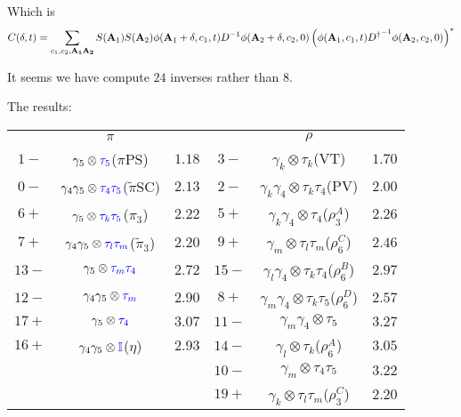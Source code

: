 Which is
\begin{equation}
\begin{split}
&C(\delta,t)=\sum _{c_1,c_2,\bf A _1 A_2}S({\bf A}_1)S({\bf A}_2) \phi ({\bf A}_1+\delta,c_1,t) D^{-1} \phi({\bf A}_2+\delta,c_2,0) \left(\phi ({\bf A}_1,c_1,t) {D^{\dagger}}^{-1} \phi({\bf A}_2,c_2,0)\right)^*\\
\end{split}
\end{equation}

It seems we have compute $24$ inverses rather than $8$.

The results:

\begin{table}
\begin{center}
\begin{tabular}{ccc|ccc}
\hline
 & $\pi$ & & & $\rho$ & \\
$1-$ & $\gamma_5 \otimes \textcolor[rgb]{0,0,1}{\tau _5}$($\pi$PS) & $1.18$ & $3-$ & $\gamma_k\otimes \tau_k$(VT) & $1.70$ \\
$0-$ & $\gamma _4\gamma _5\otimes \textcolor[rgb]{0,0,1}{\tau _4\tau _5}$($\tilde{\pi}$SC) & $2.13$ & $2-$ & $\gamma_k\gamma_4\otimes \tau_k\tau_4$(PV) & $2.00$ \\
$6+$ & $\gamma_5 \otimes \textcolor[rgb]{0,0,1}{\tau _k\tau _5}$($\pi_3$) & $2.22$ & $5+$ & $\gamma_k\gamma _4\otimes \tau_4$($\rho_3^A$) & $2.26$ \\
$7+$ & $\gamma _4\gamma_5 \otimes \textcolor[rgb]{0,0,1}{\tau _l\tau _m}$($\tilde{\pi}_3$) & $2.20$ & $9+$ & $\gamma_m\otimes \tau _l\tau_m$($\rho_6^C$) & $2.46$ \\
$13-$ & $\gamma_5 \otimes \textcolor[rgb]{0,0,1}{\tau _m\tau _4}$ & $2.72$ & $15-$ & $\gamma_l\gamma _4\otimes \tau_k\tau _4$($\rho_6^B$) & $2.97$ \\
$12-$ & $\gamma _4\gamma_5 \otimes \textcolor[rgb]{0,0,1}{\tau _m}$ & $2.90$ & $8+$ & $\gamma_m\gamma _4\otimes \tau _k\tau_5$($\rho_6^D$) & $2.57$\\
$17+$ & $\gamma_5 \otimes \textcolor[rgb]{0,0,1}{\tau _4}$ & $3.07$ & $11-$ & $\gamma_m\gamma _4\otimes \tau_5$ & $3.27$\\
$16+$ & $\gamma _4\gamma_5 \otimes \textcolor[rgb]{0,0,1}{\mathbb{I}}$($\eta$) & $2.93$ & $14-$ & $\gamma_l\otimes \tau_k$($\rho_6^A$) & $3.05$ \\
 & & & $10-$ & $\gamma_m\otimes \tau _4\tau_5$ & $3.22$ \\
 & & & $19+$ & $\gamma_k\otimes \tau_l\tau _m$($\rho_3^C$) & $2.20$ \\

\end{tabular}
\end{center}
\end{table}
